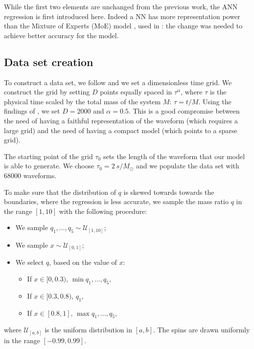 \documentclass[twocolumn,showpacs,preprintnumbers,nofootinbib,prd,
superscriptaddress,10pt]{revtex4-1}
\begin{document}
While the first two elements are unchanged from the previous work, the ANN regression is first introduced here. Indeed a NN has more representation power than the Mixture of Experts (MoE) model \cite{Jacobs1991AdaptiveMoE}, used in \cite{Schmidt:2020yuu}: the change was needed to achieve better accuracy for the model.

\subsection{Data set creation}
\label{sec:data_set}

To construct a data set, we follow \cite{Schmidt:2020yuu} and we set a dimensionless time grid. We construct the grid 
by setting $D$ points equally spaced in $\tau^\alpha$, where $\tau$ is the physical time scaled by the total mass of 
the system $M$: $\tau = t/M$. Using the findings of \cite{Schmidt:2020yuu}, we set $D = \text{2000}$ and 
$\alpha = \text{0.5}$.
%
This is a good compromise between the need of having a faithful representation of the waveform (which requires 
a large grid) and the need of having a compact model (which points to a sparse grid).

The starting point of the grid $\tau_0$ sets the length of the waveform that our model is able to generate. 
We choose $\tau_0 = \SI{2}{s/M_\odot}$ and we populate the data set with $68000$ waveforms.

To make sure that the distribution of $q$ is skewed towards towards the boundaries, where the regression is less accurate, we sample the mass ratio $q$ in the range $[1,10]$ with the following procedure:
\begin{itemize}
	\item We sample $q_1, \hdots, q_5 \sim \mathcal{U}_{[1,10]}$;
	\item We sample $x \sim \mathcal{U}_{[0,1]}$;
	\item We select $q$, based on the value of $x$:
	\begin{itemize}
		\item If $x \in [0,0.3)$, $\min q_1, \hdots, q_5$,
		\item If $x \in [0.3, 0.8)$, $q_1$,
		\item If $x \in [0.8, 1]$, $\max q_1, \hdots, q_5$,
	\end{itemize}
\end{itemize}
where $\mathcal{U}_{[a,b]}$ is the uniform distribution in $[a,b]$.
The spins are drawn uniformly in the range $[-0.99, 0.99]$.
\end{document}
